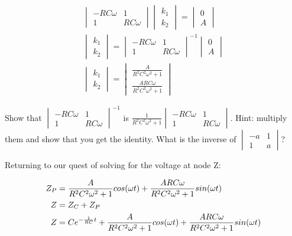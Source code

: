 \begin{align}
\begin{vmatrix}-RC\omega&1\\1&RC\omega \end{vmatrix}
\begin{vmatrix}k_1\\k_2 \end{vmatrix} = \begin{vmatrix}0\\A \end{vmatrix}\\
\begin{vmatrix}k_1\\k_2 \end{vmatrix} = \begin{vmatrix}-RC\omega&1\\1&RC\omega \end{vmatrix}^{-1}
\begin{vmatrix}0\\A \end{vmatrix}\\
\begin{vmatrix}k_1\\k_2 \end{vmatrix} = 
\begin{vmatrix}\frac{A}{R^2C^2\omega^2+1}\\ \frac{ARC\omega}{R^2C^2\omega^2+1} \end{vmatrix}
\end{align}

\begin{clevel}
Show that $\begin{vmatrix}-RC\omega&1\\1&RC\omega \end{vmatrix}^{-1}$ is 
$\frac{1}{R^2C^2\omega^2+1}\begin{vmatrix}-RC\omega&1\\1&RC\omega \end{vmatrix}$. Hint: multiply them and show that you get the identity. What is the inverse of $\begin{vmatrix}-a&1\\1&a \end{vmatrix}$?
\end{clevel}

Returning to our quest of solving for the voltage at node Z:

\begin{align}
Z_P&=\frac{A}{R^2C^2\omega^2+1}cos(\omega t)+\frac{ARC\omega}{R^2C^2\omega^2+1}sin(\omega t) \notag\\
Z&=Z_C+Z_P \notag\\
Z&=Ce^{-\frac{1}{RC}t}+
	\frac{A}{R^2C^2\omega^2+1}cos(\omega t)+\frac{ARC\omega}{R^2C^2\omega^2+1}sin(\omega t)
\label{E:8Z}
\end{align}

